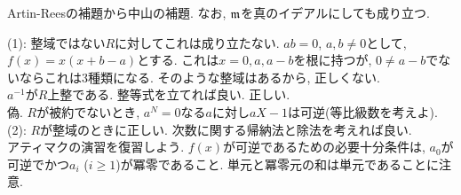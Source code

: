 \begin{probans}
Artin-Reesの補題から中山の補題. なお, $\mathfrak{m}$を真のイデアルにしても成り立つ.
\end{probans}


\begin{probans}
(1): 整域ではない$R$に対してこれは成り立たない. $ab=0$, $a,b\neq 0$として, $f(x) = x(x+b-a)$とする. これは$x=0,a,a-b$を根に持つが, $0\neq a-b$でないならこれは3種類になる. そのような整域はあるから, 正しくない. \\
 $a^{-1}$が$R$上整である. 整等式を立てれば良い. 正しい. \\
 偽. $R$が被約でないとき, $a^N = 0$なる$a$に対し$aX - 1$は可逆(等比級数を考えよ).\\
(2): $R$が整域のときに正しい. 次数に関する帰納法と除法を考えれば良い. \\
 アティマクの演習を復習しよう. $f(x)$が可逆であるための必要十分条件は, $a_0$が可逆でかつ$a_i$ ($i\geq 1$)が冪零であること. 単元と冪零元の和は単元であることに注意.
\end{probans}





\newpage
